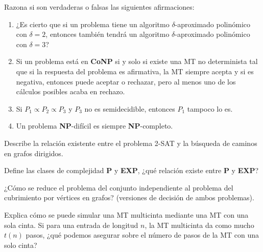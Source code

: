 \documentclass[12pt]{article}
\begin{document}
    \begin{ejercicio}[2 puntos]
        Razona si son verdaderas o falsas las siguientes afirmaciones:
        \begin{enumerate}
            \item ¿Es cierto que si un problema tiene un algoritmo $\delta$-aproximado polinómico con $\delta = 2$, entonces también tendrá un algoritmo $\delta$-aproximado polinómico con $\delta = 3$?
            
            \item Si un problema está en \textbf{CoNP} si y solo si existe una MT no determinista tal que si la respuesta del problema es afirmativa, la MT siempre acepta y si es negativa, entonces puede aceptar o rechazar, pero al menos uno de los cálculos posibles acaba en rechazo.
            
            \item Si $P_1 \propto P_2 \propto P_3$ y $P_3$ no es semidecidible, entonces $P_1$ tampoco lo es.
            
            \item Un problema \textbf{NP}-difícil es siempre \textbf{NP}-completo.
        \end{enumerate}
    \end{ejercicio}

    \begin{ejercicio}[1.5 puntos]
        Describe la relación existente entre el problema 2-SAT y la búsqueda de caminos en grafos dirigidos.
    \end{ejercicio}

    \begin{ejercicio}[1.5 puntos]
        Define las clases de complejidad \textbf{P} y \textbf{EXP}, ¿qué relación existe entre \textbf{P} y \textbf{EXP}?
    \end{ejercicio}

    \begin{ejercicio}[1.5 puntos]
        ¿Cómo se reduce el problema del conjunto independiente al problema del cubrimiento por vértices en grafos? (versiones de decisión de ambos problemas).
    \end{ejercicio}

    \begin{ejercicio}[1.5 puntos]
        Explica cómo se puede simular una MT multicinta mediante una MT con una sola cinta. Si para una entrada de longitud $n$, la MT multicinta da como mucho $t(n)$ pasos, ¿qué podemos asegurar sobre el número de pasos de la MT con una solo cinta?
    \end{ejercicio}
\end{document}
